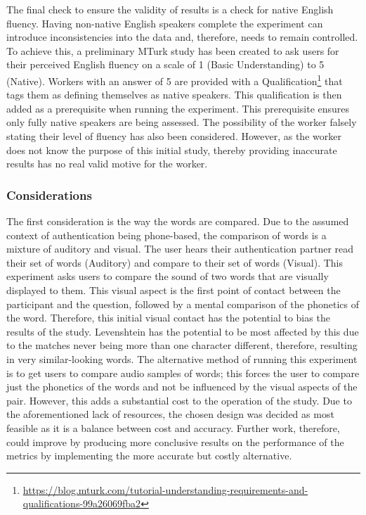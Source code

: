 The final check to ensure the validity of results is a check for native English fluency. Having non-native English speakers complete the 
experiment can introduce inconsistencies into the 
data and, therefore, needs to remain controlled. To achieve this, a preliminary MTurk study has been created to ask users for their perceived 
English fluency on a scale of 1 (Basic Understanding) to 5 (Native). 
Workers with an answer of 5 are provided with a 
Qualification\footnote{\url{https://blog.mturk.com/tutorial-understanding-requirements-and-qualifications-99a26069fba2}} 
that tags them as defining themselves as native speakers. This qualification is then 
added as a prerequisite when running the experiment. This prerequisite ensures 
only fully native speakers are being assessed. The possibility of the 
worker falsely stating their level of fluency has also been considered. 
However, as the worker does not know the purpose of this initial study,
thereby providing inaccurate results has no real valid motive for the 
worker.

\subsubsection{Considerations}
\label{sec:exp1_considerations}

The first consideration is the way the words are compared. Due to the assumed context of authentication being phone-based, the comparison of words is a mixture of auditory and visual. The user hears their authentication partner read their set of words (Auditory) and compare to their set of words (Visual). This experiment asks users to compare the sound of two words that are visually displayed to them. This visual aspect is the first point of contact between the participant and the question, followed by a mental comparison of the phonetics of the word. Therefore, this initial visual contact has the potential to bias the results of the study. Levenshtein has the potential to be most affected by this due to the matches never being more than one character different, therefore, resulting in very similar-looking words. The alternative method of running this experiment is to get users to compare audio samples of words; this forces the user to compare just the phonetics of the words and not be influenced by the visual aspects of the pair. However, this adds a substantial cost to the operation of the study. Due to the aforementioned lack of resources, the chosen design was decided as most feasible as it is a balance between cost and accuracy. Further work, therefore, could improve by producing more conclusive results on the performance of the metrics by implementing the more accurate but costly alternative.

